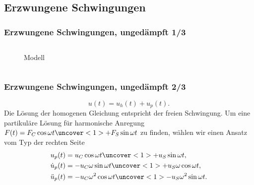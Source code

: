 \subsection{Erzwungene Schwingungen}
\begin{frame}
\frametitle{Erzwungene Schwingungen, {\normalsize ungedämpft 1/3}}
\begin{columns}
        \begin{column}[t]{.5\linewidth}
\begin{figure}
        
        \caption*{Modell }
\end{figure}
        \end{column}
		\hfill
		\begin{column}[t]{.5\linewidth}
		\end{column}
\end{columns}
\end{frame}

\begin{frame}
\frametitle{Erzwungene Schwingungen, {\normalsize ungedämpft 2/3}}
\begin{equation*}
 u(t)=u_h(t)+u_p(t).
\end{equation*}
Die Lösung der homogenen Gleichung entspricht der freien Schwingung. Um eine partikuläre Lösung für harmonische Anregung $F(t)=F_C\cos\omega t\uncover<1>{+F_S\sin\omega t}$ zu finden, wählen wir einen Ansatz vom Typ der rechten Seite
\begin{align*}
u_p(t)&=u_C\cos\omega t\uncover<1>{+u_S\sin\omega t},\\
\dot{u}_p(t)&=-u_C\omega\sin\omega t\uncover<1>{+u_S\omega\cos\omega t},\\
\ddot{u}_p(t)&=-u_C\omega^2\cos\omega t\uncover<1>{-u_S\omega^2\sin\omega t}.\\
\end{align*}
\end{frame}


